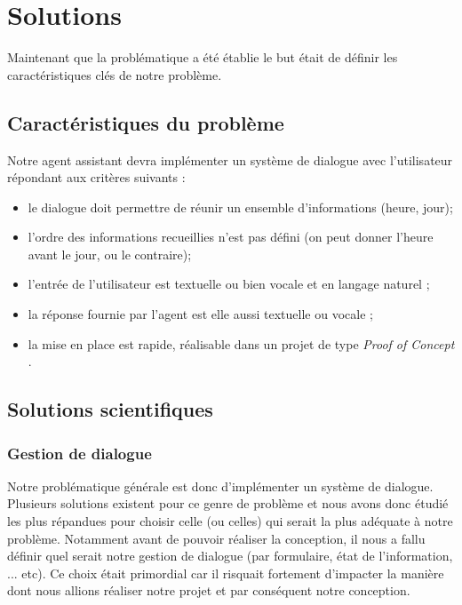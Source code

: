 \chapter{Solutions}

Maintenant que la problématique a été établie le but était de définir les caractéristiques clés de notre problème.


\section{Caractéristiques du problème}
Notre agent assistant devra implémenter un système de dialogue avec l'utilisateur répondant aux critères suivants :
\begin{itemize}
	\item le dialogue doit permettre de réunir un ensemble d'informations (heure, jour);
 	\item l'ordre des informations recueillies n'est pas défini (on peut donner l'heure avant le jour, ou le contraire);
 	\item l'entrée de l'utilisateur est textuelle ou bien vocale et en langage naturel ;
 	\item la réponse fournie par l'agent est elle aussi textuelle ou vocale ;
 	\item la mise en place est rapide, réalisable dans un projet de type \og \textit{Proof of Concept} \fg.
\end{itemize}

\section{Solutions scientifiques}

\subsection{Gestion de dialogue}
Notre problématique générale est donc d'implémenter un système de dialogue. Plusieurs solutions existent pour ce genre de problème et nous avons donc étudié les plus répandues pour choisir celle (ou celles) qui serait la plus adéquate à notre problème. Notamment avant de pouvoir réaliser la conception, il nous a fallu définir quel serait notre gestion de dialogue (par formulaire, état de l'information, ... etc). Ce choix était primordial car il risquait fortement d'impacter la manière dont nous allions réaliser notre projet et par conséquent notre conception.


\FloatBarrier

